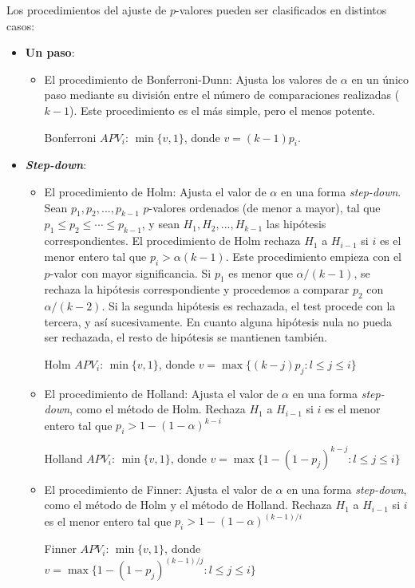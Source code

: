 Los procedimientos del ajuste de $p$-valores pueden ser clasificados en distintos casos:
\begin{itemize}
	\item \textbf{Un paso}: 
	\begin{itemize}
		\item El procedimiento de Bonferroni-Dunn: 
		Ajusta los valores de $\alpha$ en un único paso mediante su división entre el número de comparaciones realizadas ($k-1$). 
		Este procedimiento es el más simple, pero el menos potente. 
		
		Bonferroni $APV_i$: $\min\{v,1\}$, donde $v = (k-1)p_i$.
	\end{itemize}
	\item \textbf{\textit{Step-down}}:
	\begin{itemize}
		\item El procedimiento de Holm: 
		Ajusta el valor de $\alpha$ en una forma \textit{step-down}. 
		Sean $p_1,p_2,...,p_{k-1}$ $p$-valores ordenados (de menor a mayor), tal que $p_1 \leq p_2 \leq \cdots \leq p_{k-1}$, y sean $H_1,H_2,...,H_{k-1}$ las hipótesis correspondientes. 
		El procedimiento de Holm rechaza $H_1$ a $H_{i-1}$ si $i$ es el menor entero tal que $p_i > \alpha (k-1)$. 
		Este procedimiento empieza con el $p$-valor con mayor significancia. 
		Si $p_1$ es menor que $\alpha /(k-1)$, se rechaza la hipótesis correspondiente y procedemos a comparar $p_2$ con $\alpha /(k-2)$. 
		Si la segunda hipótesis es rechazada, el test procede con la tercera, y así sucesivamente. 
		En cuanto alguna hipótesis nula no pueda ser rechazada, el resto de hipótesis se mantienen también. 
		
		Holm $APV_i$: $\min\{v,1\}$, donde $v = \max\{(k-j)p_j : l\leq j \leq i\}$
		\item El procedimiento de Holland: Ajusta el valor de $\alpha$ en una forma \textit{step-down}, como el método de Holm. 
		Rechaza $H_1$ a $H_{i-1}$ si $i$ es el menor entero tal que $p_i > 1 - (1-\alpha)^{k-i}$
		
		Holland $APV_i$: $\min\{v,1\}$, donde $v = \max\{1 - (1-p_j)^{k-j} : l\leq j \leq i\}$
		\item El procedimiento de Finner: Ajusta el valor de $\alpha$ en una forma \textit{step-down}, como el método de Holm y el método de Holland. 
		Rechaza $H_1$ a $H_{i-1}$ si $i$ es el menor entero tal que $p_i > 1 - (1-\alpha)^{(k-1)/i}$
		
		Finner $APV_i$: $\min\{v,1\}$, donde $v = \max\{1 - (1-p_j)^{(k-1)/j} : l\leq j \leq i\}$
	\end{itemize}
	

\end{itemize}
